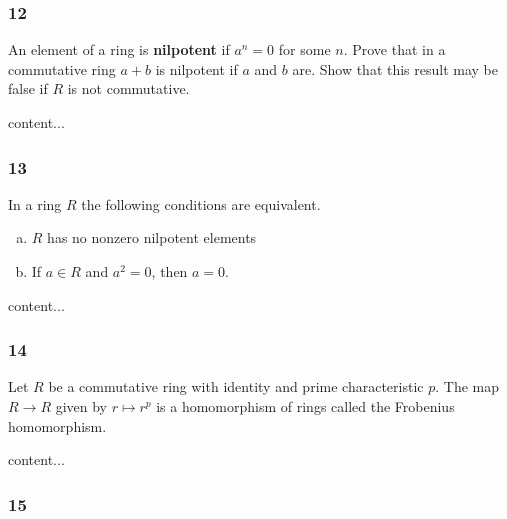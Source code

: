 \subsubsection*{12}
\begin{graybox}
	An element of a ring is \textbf{nilpotent} if $a^n = 0$ for some $n$. Prove that in a commutative ring $a + b$ is nilpotent if $a$ and $b$ are. Show that this result may be false if $R$ is not commutative. 
\end{graybox}
\begin{solution}
	content...
\end{solution}

\subsubsection*{13}
\begin{graybox}
	In a ring $R$ the following conditions are equivalent.
	\begin{enumerate}[(a)]
		\item $R$ has no nonzero nilpotent elements
		\item If $a \in R$ and $a^2 = 0$, then $a = 0$.
	\end{enumerate}
\end{graybox}
\begin{solution}
	content...
\end{solution}

\subsubsection*{14}
\begin{graybox}
	Let $R$ be a commutative ring with identity and prime characteristic $p$. The map $R \to R$ given by $r \mapsto r^p$ is a homomorphism of rings called the Frobenius homomorphism.
\end{graybox}
\begin{solution}
	content...
\end{solution}

\subsubsection*{15}

